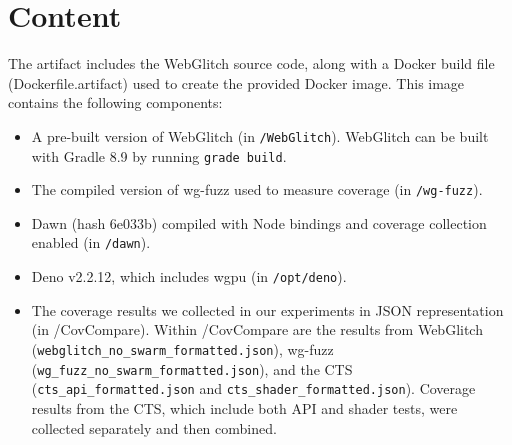 \documentclass[a4paper,UKenglish]{darts-v2021}
\newenvironment{content}{\section{Content}}{}
\begin{document}
\begin{content}
The artifact includes the WebGlitch source code, along with a Docker build file (Dockerfile.artifact) used to create the provided Docker image. This image contains the following components:
\begin{itemize}
    \item A pre-built version of WebGlitch (in \texttt{/WebGlitch}). WebGlitch can be built with Gradle 8.9 by running \texttt{grade build}.
    \item The compiled version of wg-fuzz used to measure coverage (in \texttt{/wg-fuzz}).
    \item Dawn (hash 6e033b) compiled with Node bindings and coverage collection enabled (in \texttt{/dawn}). 
    \item Deno v2.2.12, which includes wgpu (in \texttt{/opt/deno}).
    \item The coverage results we collected in our experiments in JSON representation (in /CovCompare). Within /CovCompare are the results from WebGlitch (\texttt{webglitch\_no\_swarm\_formatted.json}), wg-fuzz (\texttt{wg\_fuzz\_no\_swarm\_formatted.json}), and the CTS (\texttt{cts\_api\_formatted.json} and \texttt{cts\_shader\_formatted.json}). Coverage results from the CTS, which include both API and shader tests, were collected separately and then combined.
\end{itemize}
\end{content}
\end{document}

